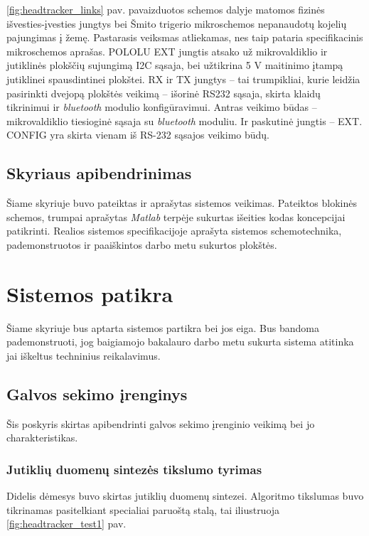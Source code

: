 \documentclass[]{vgtuef}
\begin{document}
{\ref{fig:headtracker_links} pav. pavaizduotos schemos dalyje matomos fizinės išvesties-įvesties jungtys bei Šmito trigerio mikroschemos nepanaudotų kojelių pajungimas į žemę. Pastarasis veiksmas atliekamas, nes taip pataria specifikacinis mikroschemos aprašas. POLOLU EXT jungtis atsako už mikrovaldiklio ir jutiklinės plokščių sujungimą I2C sąsaja, bei užtikrina 5 V maitinimo įtampą jutiklinei spausdintinei plokštei. RX ir TX jungtys – tai trumpikliai, kurie leidžia pasirinkti dvejopą plokštės veikimą – išorinė RS232 sąsaja, skirta klaidų tikrinimui ir \textit{bluetooth} modulio konfigūravimui. Antras veikimo būdas – mikrovaldiklio tiesioginė sąsaja su \textit{bluetooth} moduliu. Ir paskutinė jungtis – EXT. CONFIG yra skirta vienam iš RS-232 sąsajos veikimo būdų.

\subsection{Skyriaus apibendrinimas}

Šiame skyriuje buvo pateiktas ir aprašytas sistemos veikimas. Pateiktos blokinės schemos, trumpai aprašytas \textit{Matlab} terpėje sukurtas išeities kodas koncepcijai patikrinti. Realios sistemos specifikacijoje aprašyta sistemos schemotechnika, pademonstruotos ir paaiškintos darbo metu sukurtos plokštės.

\section{Sistemos patikra}

Šiame skyriuje bus aptarta sistemos partikra bei jos eiga. Bus bandoma pademonstruoti, jog baigiamojo bakalauro darbo metu sukurta sistema atitinka jai iškeltus techninius reikalavimus.

\subsection{Galvos sekimo įrenginys}

Šis poskyris skirtas apibendrinti galvos sekimo įrenginio veikimą bei jo charakteristikas.

\subsubsection{Jutiklių duomenų sintezės tikslumo tyrimas}

Didelis dėmesys buvo skirtas jutiklių duomenų sintezei. Algoritmo tikslumas buvo tikrinamas pasitelkiant specialiai paruoštą stalą, tai iliustruoja \ref{fig:headtracker_test1} pav.

}
\end{document}
